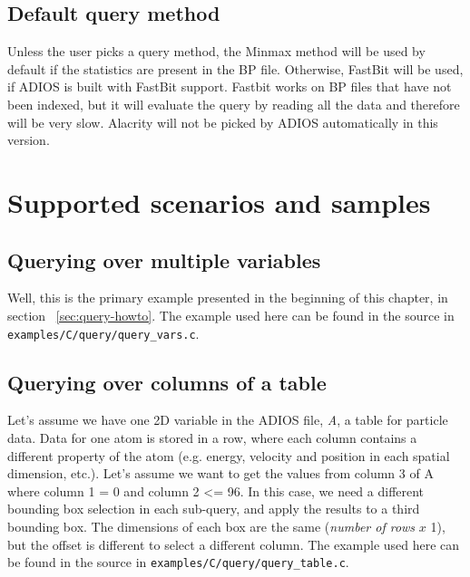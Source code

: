 \subsection{Default query method}
Unless the user picks a query method, the Minmax method will be used by default if the statistics are present in the BP file. Otherwise, FastBit will be used, if ADIOS is built with FastBit support. Fastbit works on BP files that have not been indexed, but it will evaluate the query by reading all the data and therefore will be very slow. Alacrity will not be picked by ADIOS automatically in this version.



%
%
\section{Supported scenarios and samples}


\subsection{Querying over multiple variables}
Well, this is the primary example presented in the beginning of this chapter, in section ~\ref{sec:query-howto}. The example used here can be found in the source in \verb+examples/C/query/query_vars.c+.

\subsection{Querying over columns of a table}
\label{sec:query-example-columns}
Let's assume we have one 2D variable in the ADIOS file, \emph{A}, a table for particle data. Data for one atom is stored in a row, where each column contains a different property of the atom (e.g. energy, velocity and position in each spatial dimension, etc.).
Let's assume we want to get the values from column 3 of A where column 1 = 0 and  column 2 <= 96.
In this case, we need a different bounding box selection in each sub-query, and apply the results to a third bounding box. The dimensions of each box are the same (\emph{number of rows} $x$ 1), but the offset is different to select a different column. The example used here can be found in the source in \verb+examples/C/query/query_table.c+.

